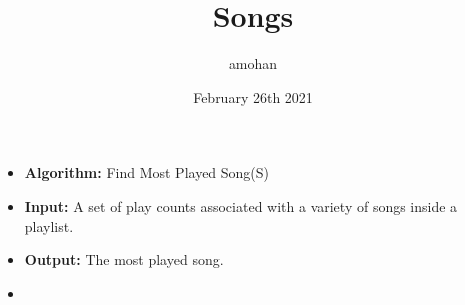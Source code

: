 \documentclass{article}
\title{Songs}
\author{amohan}
\date{February 26th 2021}
\begin{document}
\begin{itemize}
\item[]
\textbf{Algorithm:} Find Most Played Song(S)
\item[]
\textbf{Input:} A set of play counts associated with a variety of songs inside a playlist.
\item[]
\textbf{Output:} The most played song.
\item[]
\end{itemize}
\end{document}
